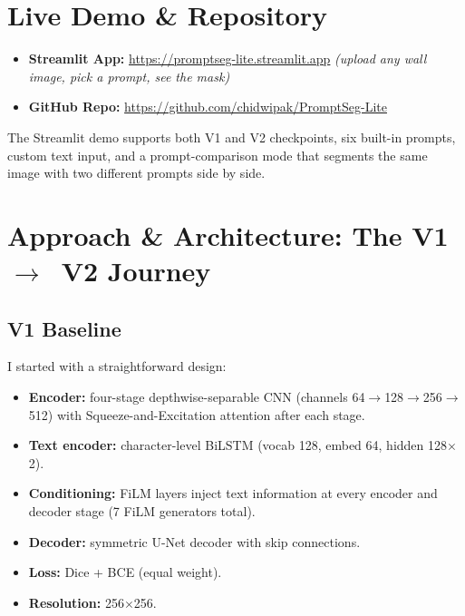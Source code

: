 \documentclass[12pt,a4paper]{article}
\begin{document}
\section{Live Demo \& Repository}

\begin{tcolorbox}[colback=boxbg, colframe=originblue, title=Links]
\begin{itemize}[nosep]
  \item \textbf{Streamlit App:} \url{https://promptseg-lite.streamlit.app}
        \hfill\textit{(upload any wall image, pick a prompt, see the mask)}
  \item \textbf{GitHub Repo:} \url{https://github.com/chidwipak/PromptSeg-Lite}
\end{itemize}
\end{tcolorbox}

The Streamlit demo supports both V1 and V2 checkpoints, six built-in prompts, custom text input, and a prompt-comparison mode that segments the same image with two different prompts side by side.

\section{Approach \& Architecture: The V1~$\to$~V2 Journey}

\subsection{V1 Baseline}

I started with a straightforward design:

\begin{itemize}[nosep]
  \item \textbf{Encoder:} four-stage depthwise-separable CNN (channels 64$\to$128$\to$256$\to$512) with Squeeze-and-Excitation attention after each stage.
  \item \textbf{Text encoder:} character-level BiLSTM (vocab 128, embed 64, hidden 128$\times$2).
  \item \textbf{Conditioning:} FiLM layers inject text information at every encoder and decoder stage (7 FiLM generators total).
  \item \textbf{Decoder:} symmetric U-Net decoder with skip connections.
  \item \textbf{Loss:} Dice + BCE (equal weight).
  \item \textbf{Resolution:} 256$\times$256.
\end{itemize}
\end{document}
